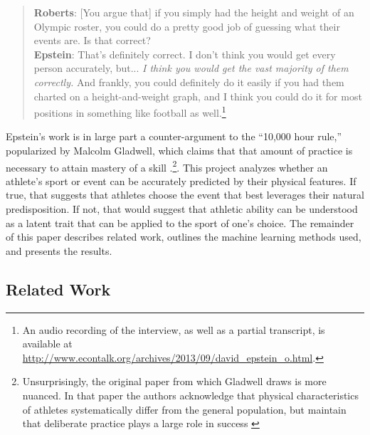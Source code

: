 \documentclass[12pt,letterpaper]{article} %
\begin{document}
\begin{quote}
\footnotesize
\textbf{Roberts}: [You argue that] if you simply had the height and weight of an Olympic roster, you could do a pretty good job of guessing what their events are. Is that correct? \\
\textbf{Epstein}: That's definitely correct. I don't think you would get every person accurately, but... \textit{I think you would get the vast majority of them correctly.} And frankly, you could definitely do it easily if you had them charted on a height-and-weight graph, and I think you could do it for most positions in something like football as well.\footnote{An audio recording of the interview, as well as a partial transcript, is available at \url{http://www.econtalk.org/archives/2013/09/david_epstein_o.html}.}
\end{quote}

Epstein's work is in large part a counter-argument to the ``10,000 hour rule,'' popularized by Malcolm Gladwell, which claims that that amount of practice is necessary to attain mastery of a skill \citep{gladwell2008outliers}.\footnote{Unsurprisingly, the original paper from which Gladwell draws is more nuanced. In that paper the authors acknowledge that physical characteristics of athletes systematically differ from the general population, but maintain that deliberate practice plays a large role in success \citep{ericsson1993role}}. This project analyzes whether an athlete's sport or event can be accurately predicted by their physical features. If true, that suggests that athletes choose the event that best leverages their natural predisposition. If not, that would suggest that athletic ability can be understood as a latent trait that can be applied to the sport of one's choice. The remainder of this paper describes related work, outlines the machine learning methods used, and presents the results.


\subsection{Related Work}



\end{document}
